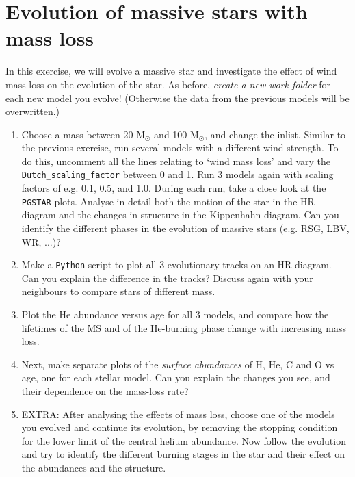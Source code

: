 \documentclass[11pt,a4paper]{article}
\newcommand{\todo}[1]{\textbf{\textcolor{red}{#1}}}
\begin{document}
\section{Evolution of massive stars with mass loss}

In this exercise, we will evolve a massive star and investigate the effect of wind mass loss on the evolution of the star. As before, \emph{create a new work folder} for each new model you evolve! (Otherwise the data from the previous models will be overwritten.)
\begin{enumerate}
\item Choose a mass between 20 M$_\odot$ and 100 M$_\odot$, and change the inlist. Similar to the previous exercise, run several models with a different wind strength. To do this, uncomment all the lines relating to `wind mass loss' and vary the \verb|Dutch_scaling_factor| between 0 and 1. Run 3 models again with scaling factors of e.g. 0.1, 0.5, and 1.0. During each run, take a close look at the \texttt{PGSTAR} plots. Analyse in detail both the motion of the star in the HR diagram and the changes in structure in the Kippenhahn diagram. Can you identify the different phases in the evolution of massive stars (e.g. RSG, LBV, WR, ...)? %
\item Make a \texttt{Python} script to plot all 3 evolutionary tracks on an HR diagram. Can you explain the difference in the tracks? Discuss again with your neighbours to compare stars of different mass.
\item Plot the He abundance versus age for all 3 models, and compare how the lifetimes of the MS and of the He-burning phase change with increasing mass loss.
\item Next, make separate plots of the \emph{surface abundances} of H, He, C and O vs age, one for each stellar model. Can you explain the changes you see, and their dependence on the mass-loss rate?

\item EXTRA: After analysing the effects of mass loss, choose one of the models you evolved and continue its evolution, by removing the stopping condition for the lower limit of the central helium abundance. 
Now follow the evolution and try to identify the different burning stages in the star and their effect on the abundances and the structure. 
\end{enumerate}






% 
% 
\end{document}
